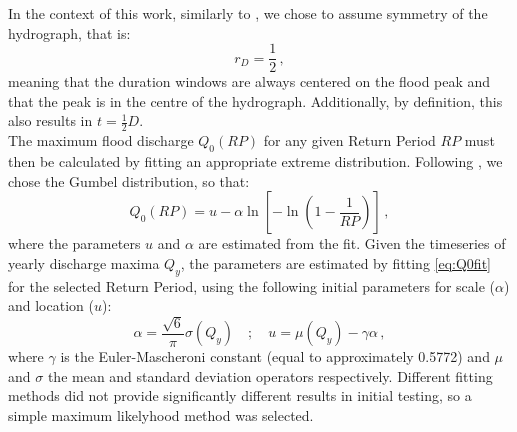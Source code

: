 In the context of this work, similarly to \citet{Alfieri2014}, we chose to assume symmetry of the hydrograph, that is:
\begin{equation}
  r_D = \frac{1}{2}\,,
\end{equation}
meaning that the duration windows are always centered on the flood peak and that the peak is in the centre of the hydrograph. Additionally, by definition, this also results in $t = \tfrac{1}{2} D$.\\
The maximum flood discharge $Q_0\left(RP\right)$ for any given Return Period $RP$ must then be calculated by fitting an appropriate extreme distribution. Following \citet{Maione2003, Alfieri2015a}, we chose the Gumbel distribution, so that:
\begin{equation}\label{eq:Q0fit}
  Q_0\left(RP\right) = u - \alpha \ln \left[ -\ln \left(1 - \frac{1}{RP} \right)\right] \,,
\end{equation}
where the parameters $u$ and $\alpha$ are estimated from the fit.
Given the timeseries of yearly discharge maxima $Q_y$, the parameters are estimated by fitting \cref{eq:Q0fit} for the selected Return Period, using the following initial parameters for scale ($\alpha$) and location ($u$):
\begin{equation}
  \alpha = \frac{\sqrt{6}}{\pi} \sigma\left(Q_y \right) \quad ; \quad u = \mu\left(Q_y\right) - \gamma \alpha \,,
\end{equation}
where $\gamma$ is the Euler-Mascheroni constant (equal to approximately 0.5772) and $\mu$ and $\sigma$ the mean and standard deviation operators respectively. Different fitting methods did not provide significantly different results in initial testing, so a simple maximum likelyhood method was selected.

